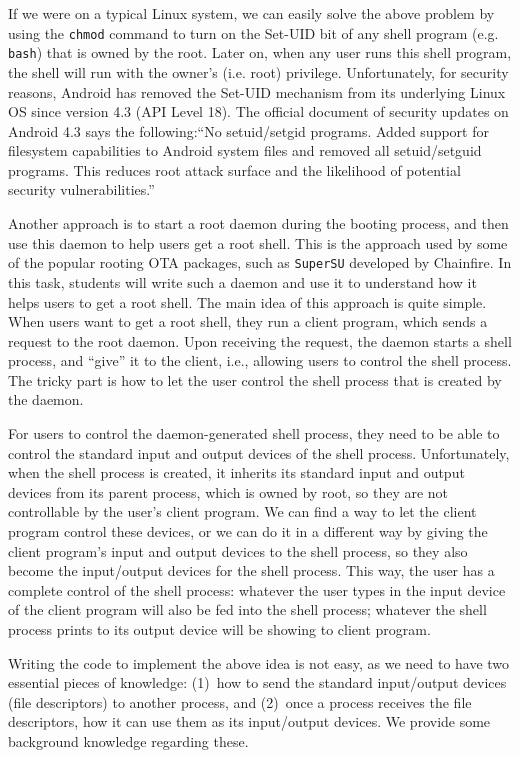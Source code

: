 If we were on a typical Linux system, we can easily solve the above problem by using the 
\texttt{chmod} command to  turn on the Set-UID bit of any shell program (e.g. \texttt{bash})
that is owned by the root. Later on, when any user runs this shell program,  the shell will run
with the owner's (i.e. root) privilege. 
Unfortunately, for security reasons, Android has removed the Set-UID mechanism from its
underlying Linux OS since version 4.3 (API Level 18).
The official document of security updates on Android 4.3 says the following:``No setuid/setgid programs. 
Added support for filesystem capabilities to Android system
files and removed all setuid/setguid programs.  This reduces root attack surface and the
likelihood of potential security vulnerabilities.''


Another approach is to start a root daemon during the booting process, and then use this daemon to
help users get a root shell. This is the approach used by some of the popular rooting OTA packages, such as 
\texttt{SuperSU} developed by Chainfire. 
In this task, students will write such a daemon and use it to understand how it helps users to get a root shell. 
The main idea of this approach is quite simple. When users want to get a root shell, they run a
client program, which sends a request to the root daemon. Upon receiving the request, the
daemon starts a shell process, and ``give'' it to the client, i.e., allowing users to control
the shell process. The tricky part is how to let the user  control the shell process that is
created by the daemon.   

For users to control the daemon-generated shell process, they need to be able to control the 
standard input and output devices of the shell process. Unfortunately, when the shell process is
created, it inherits its standard input and output devices from its parent process, which is
owned by root, so they are not controllable by the user's client program. We can find a way to
let the client program control these devices, or we can do it in a different way by 
giving the client program's input and output devices to the shell process, so they also become the
input/output devices for the shell process. This way, the user has a complete control of the
shell process: whatever the user types in the input
device of the client program will also be fed into the shell process; whatever the shell
process prints to its output device will be showing to client program. 


Writing the code to implement the above idea is not easy, as we need to have two essential
pieces of knowledge: (1)~how to send the standard input/output devices (file descriptors) to
another process, and (2)~once a process receives the file descriptors, how it can use them as
its input/output devices. We provide some background knowledge regarding these.


